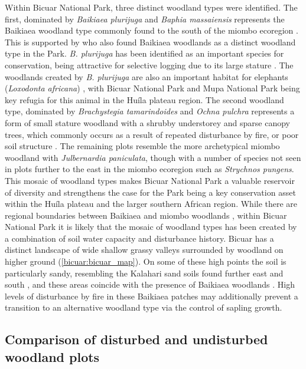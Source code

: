 \begin{refsection}
Within Bicuar National Park, three distinct woodland types were identified. The first, dominated by \textit{Baikiaea plurijuga} and \textit{Baphia massaiensis} represents the Baikiaea woodland type commonly found to the south of the miombo ecoregion \citep{Timberlake2010}. This is supported by \citet{Chisingui2018} who also found Baikiaea woodlands as a distinct woodland type in the Park. \textit{B. plurijuga} has been identified as an important species for conservation, being attractive for selective logging due to its large stature \citep{Ngandwe2017, Wallenfang2015}. The woodlands created by \textit{B. plurijuga} are also an important habitat for elephants (\textit{Loxodonta africana}) \citep{Sianga2017, Mukwashi2012}, with Bicuar National Park and Mupa National Park being key refugia for this animal in the Hu\'{i}la plateau region. The second woodland type, dominated by \textit{Brachystegia tamarindoides} and \textit{Ochna pulchra} represents a form of small stature woodland with a shrubby understorey and sparse canopy trees, which commonly occurs as a result of repeated disturbance by fire, or poor soil structure \citep{Smith2004}. The remaining plots resemble the more archetypical miombo woodland with \textit{Julbernardia paniculata}, though with a number of species not seen in plots further to the east in the miombo ecoregion such as \textit{Strychnos pungens}. This mosaic of woodland types makes Bicuar National Park a valuable reservoir of diversity and strengthens the case for the Park being a key conservation asset within the Hu\'{i}la plateau and the larger southern African region. While there are regional boundaries between Baikiaea and miombo woodlands \citep{White1983}, within Bicuar National Park it is likely that the mosaic of woodland types has been created by a combination of soil water capacity and disturbance history. Bicuar has a distinct landscape of wide shallow grassy valleys surrounded by woodland on higher ground (\autoref{bicuar:bicuar_map}). On some of these high points the soil is particularly sandy, resembling the Kalahari sand soils found further east and south \citep{Huntley2019}, and these areas coincide with the presence of Baikiaea woodlands \citep{Campbell2002}. High levels of disturbance by fire in these Baikiaea patches may additionally prevent a transition to an alternative woodland type via the control of sapling growth.

\subsection{Comparison of disturbed and undisturbed woodland plots}
\label{bicuar:ssec:disturbance_discussion}


\end{refsection}
